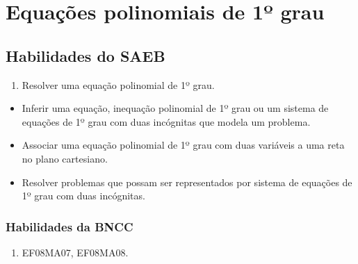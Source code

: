 








\chapter{Equações polinomiais de 1º grau}

\section{Habilidades do SAEB} 

\begin{enumerate}
\item Resolver uma equação polinomial de 1º grau.
\end{enumerate}

\begin{itemize}
\item
  Inferir uma equação, inequação polinomial de 1º grau ou um sistema de
  equações de 1º grau com duas incógnitas que modela um problema.
\item
  Associar uma equação polinomial de 1º grau com duas variáveis a uma
  reta no plano cartesiano.
\item
  Resolver problemas que possam ser representados por sistema de
  equações de 1º grau com duas incógnitas.
\end{itemize}




\subsection{Habilidades da BNCC} 

\begin{enumerate}
\item EF08MA07, EF08MA08.
\end{enumerate}

